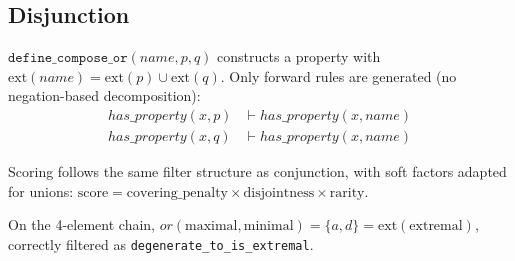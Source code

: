 \subsection{Disjunction}

$\texttt{define\_compose\_or}(\textit{name}, p, q)$ constructs a property with $\mathrm{ext}(\textit{name}) = \mathrm{ext}(p) \cup \mathrm{ext}(q)$. Only forward rules are generated (no negation-based decomposition):
\begin{align*}
\mathit{has\_property}(x, p) &\vdash \mathit{has\_property}(x, \textit{name}) \\
\mathit{has\_property}(x, q) &\vdash \mathit{has\_property}(x, \textit{name})
\end{align*}

Scoring follows the same filter structure as conjunction, with soft factors adapted for unions: $\text{score} = \text{covering\_penalty} \times \text{disjointness} \times \text{rarity}$.

On the 4-element chain, $\mathit{or}(\text{maximal}, \text{minimal}) = \{a, d\} = \mathrm{ext}(\text{extremal})$, correctly filtered as \texttt{degenerate\_to\_is\_extremal}.

